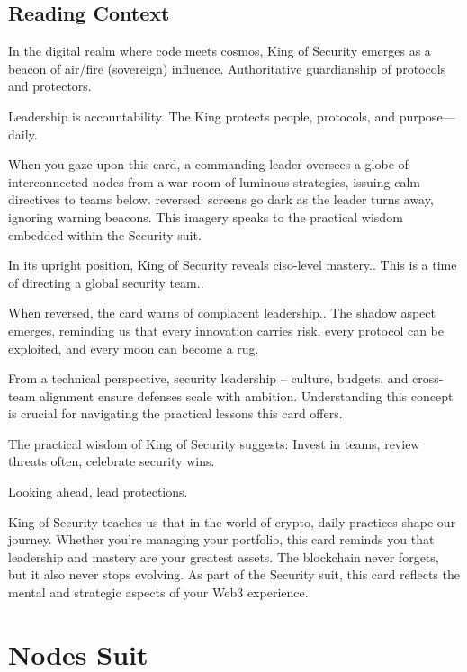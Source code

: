 \documentclass[11pt,oneside]{book}
\begin{document}
\begin{minipage}[t]{0.55\textwidth}
  \subsection*{Reading Context}
  In the digital realm where code meets cosmos, King of Security emerges as a beacon of air/fire (sovereign) influence. Authoritative guardianship of protocols and protectors.

  Leadership is accountability. The King protects people, protocols, and purpose—daily.

  When you gaze upon this card, a commanding leader oversees a globe of interconnected nodes from a war room of luminous strategies, issuing calm directives to teams below. reversed: screens go dark as the leader turns away, ignoring warning beacons. This imagery speaks to the practical wisdom embedded within the Security suit.

  In its upright position, King of Security reveals ciso-level mastery.. This is a time of directing a global security team..

  When reversed, the card warns of complacent leadership.. The shadow aspect emerges, reminding us that every innovation carries risk, every protocol can be exploited, and every moon can become a rug.

  From a technical perspective, security leadership – culture, budgets, and cross-team alignment ensure defenses scale with ambition. Understanding this concept is crucial for navigating the practical lessons this card offers.

  The practical wisdom of King of Security suggests: Invest in teams, review threats often, celebrate security wins.

  Looking ahead, lead protections.

  King of Security teaches us that in the world of crypto, daily practices shape our journey. Whether you're managing your portfolio, this card reminds you that leadership and mastery are your greatest assets. The blockchain never forgets, but it also never stops evolving. As part of the Security suit, this card reflects the mental and strategic aspects of your Web3 experience.

\end{minipage}

\section*{Nodes Suit}
\end{document}
